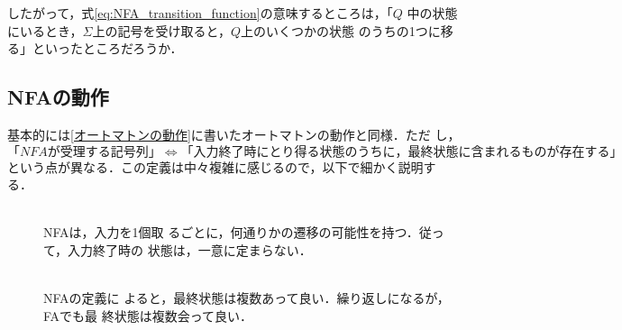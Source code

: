 したがって，式\ref{eq:NFA_transition_function}の意味するところは，「$Q$
中の状態にいるとき，$\Sigma$上の記号を受け取ると，$Q$上のいくつかの状態
のうちの1つに移る」といったところだろうか．

\subsection{NFAの動作}
基本的には\ref{オートマトンの動作}に書いたオートマトンの動作と同様．ただ
し，
\[
 「NFAが受理する記号列」\Leftrightarrow「入力終了時にとり得る状態のうち
 に，最終状態に含まれるものが存在する」
\]
という点が異なる．この定義は中々複雑に感じるので，以下で細かく説明す
る．

\begin{description}
 \item[] \mbox{} \\
NFAは，入力を1個取
            るごとに，何通りかの遷移の可能性を持つ．従って，入力終了時の
            状態は，一意に定まらない．
 \item[] \mbox{} \\
NFAの定義に
            よると，最終状態は複数あって良い．繰り返しになるが，FAでも最
            終状態は複数会って良い．
\end{description}


